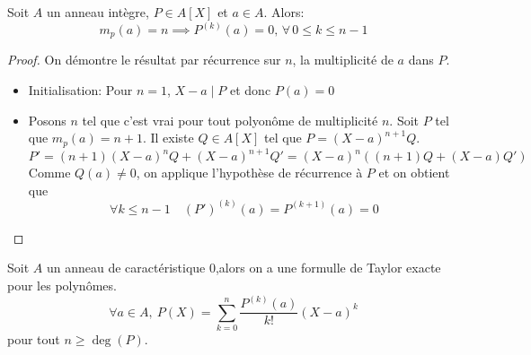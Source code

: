 \begin{lemma}
	Soit $A$ un anneau intègre, $P \in A[X]$ et $a \in A$.
	Alors:
	$$ m_p(a) = n \implies P^{(k)}(a) = 0 , \, \forall\, 0 \leq k \leq n-1$$
\end{lemma}

\begin{proof}
	On démontre le résultat par récurrence sur $n$, la multiplicité de $a$ dans $P$.
	\begin{itemize}
		\item Initialisation: Pour $n = 1$, $X-a \mid P$ et donc $P(a) = 0$
		\item Posons $n$ tel que c'est vrai pour tout polyonôme de multiplicité $n$.
		      Soit $P$ tel que $m_p(a) = n+1$. Il existe $Q \in A[X]$ tel que $P = (X-a)^{n+1}Q$.
		      $$P' = (n+1)(X-a)^nQ + (X-a)^{n+1}Q' = (X-a)^n((n+1)Q + (X-a)Q')$$
		      Comme $Q(a) \neq 0$, on applique l'hypothèse de récurrence à $P$ et on obtient que
		      $$ \forall k \leq n-1 \quad (P')^{(k)}(a) = P^{(k+1)}(a) = 0 $$
	\end{itemize}
\end{proof}

\begin{prop}[Admis]
	Soit $A$ un anneau de caractéristique $0$,alors on a une formulle de Taylor exacte pour les polynômes.
	$$\forall a \in A, \  P(X) = \sum\limits_{k=0}^n \frac{P^{(k)}(a)}{k!}(X-a)^k $$
	pour tout $n \geq \deg(P)$.
\end{prop}



